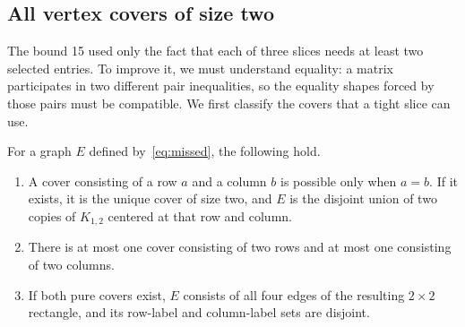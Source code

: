 \subsection{All vertex covers of size two}
The bound 15 used only the fact that each of three slices needs at least
two selected entries. To improve it, we must understand equality: a matrix
participates in two different pair inequalities, so the equality shapes
forced by those pairs must be compatible. We first classify the covers
that a tight slice can use.

\begin{lemma}\label{lem:covers}
For a graph $E$ defined by~\eqref{eq:missed}, the following hold.
\begin{enumerate}
\item A cover consisting of a row $a$ and a column $b$ is possible only
when $a=b$. If it exists, it is the unique cover of size two, and $E$ is
the disjoint union of two copies of $K_{1,2}$ centered at that row and column.
\item There is at most one cover consisting of two rows and at most one
consisting of two columns.
\item If both pure covers exist, $E$ consists of all four edges of the
resulting $2\times2$ rectangle, and its row-label and column-label sets are
disjoint.
\end{enumerate}
\end{lemma}
